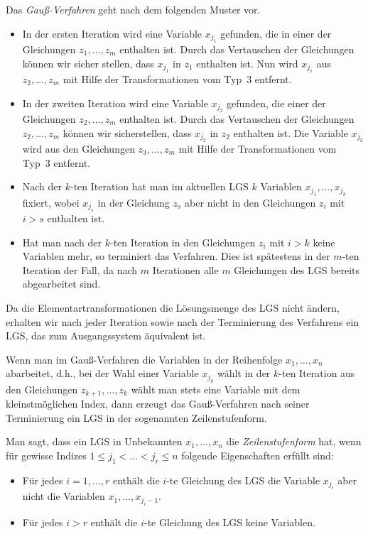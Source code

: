 \begin{framed} 
	Das \emph{Gauß-Verfahren} geht nach dem folgenden Muster vor.
	
	\begin{itemize} 
		\item In der ersten Iteration wird eine Variable $x_{j_1}$ gefunden, die in einer der Gleichungen $z_1,\ldots,z_m$ enthalten ist. Durch das Vertauschen der Gleichungen können wir sicher stellen, dass $x_{j_1}$ in $z_1$ enthalten ist. Nun wird $x_{j_1}$ aus $z_2,\ldots,z_m$ mit Hilfe der Transformationen vom Typ~3 entfernt. 
	
		\item In der zweiten Iteration wird eine Variable $x_{j_2}$ gefunden, die einer der Gleichungen $z_2,\ldots,z_m$ enthalten ist. Durch das Vertauschen der Gleichungen $z_2,\ldots,z_m$ können wir sicherstellen, dass $x_{j_2}$ in $z_2$ enthalten ist. Die Variable $x_{j_2}$ wird aus den Gleichungen $z_3,\ldots,z_m$ mit Hilfe der Transformationen vom Typ~3 entfernt. 
	
		\item Nach der $k$-ten Iteration hat man im aktuellen LGS $k$ Variablen $x_{j_1},\ldots,x_{j_k}$ fixiert, wobei $x_{j_s}$ in der Gleichung $z_s$ aber nicht in den Gleichungen $z_i$ mit $i > s$ enthalten ist. 
		\item 	Hat man nach der $k$-ten Iteration in den Gleichungen $z_i$ mit $i > k$ keine Variablen mehr, so terminiert das Verfahren. Dies ist spätestens in der $m$-ten Iteration der Fall, da nach $m$ Iterationen alle $m$ Gleichungen des LGS bereits abgearbeitet sind. 
	\end{itemize} 
	
	Da die Elementartransformationen die Lösungsmenge des LGS nicht ändern, erhalten wir nach jeder Iteration sowie nach der Terminierung des Verfahrens ein LGS, das zum Ausgangssystem äquivalent ist. 
	\end{framed}

Wenn man im Gauß-Verfahren die Variablen in der Reihenfolge $x_1,\ldots,x_n$ abarbeitet, d.h., bei der Wahl einer Variable $x_{j_k}$ wählt in der $k$-ten Iteration aus den Gleichungen $z_{k+1},\ldots,z_k$ wählt man stets eine Variable mit dem kleinstmöglichen Index, dann erzeugt das Gauß-Verfahren nach seiner Terminierung ein LGS in der sogenannten Zeilenstufenform. 

Man sagt, dass ein LGS  in Unbekannten $x_1,\ldots,x_n$ die \emph{Zeilenstufenform} hat, wenn für gewisse Indizes $1 \le j_1 < \ldots < j_r \le n$ folgende Eigenschaften erfüllt sind: 
\begin{itemize}
	\item Für jedes $i=1,\ldots,r$ enthält die $i$-te Gleichung des LGS die Variable $x_{j_i}$ aber nicht die Variablen $x_1,\ldots,x_{j_i-1}$. 
	\item Für jedes $i>r$ enthält die $i$-te Gleichung des LGS keine Variablen. 
\end{itemize}

